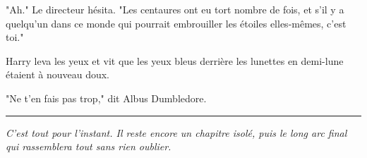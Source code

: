 "Ah." Le directeur hésita. "Les centaures ont eu tort nombre de fois, et s'il y a quelqu'un dans ce monde qui pourrait embrouiller les étoiles elles-mêmes, c'est toi."

Harry leva les yeux et vit que les yeux bleus derrière les lunettes en demi-lune étaient à nouveau doux.

"Ne t'en fais pas trop," dit Albus Dumbledore.
\par\noindent\rule{\textwidth}{0.4pt}

\begin{center}\emph{C'est tout pour l'instant. Il reste encore un chapitre isolé, puis le long arc final qui rassemblera tout sans rien oublier.} \end{center}


